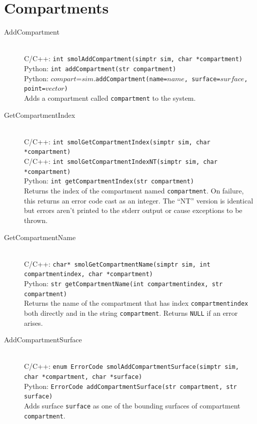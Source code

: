 \documentclass {scrbook}
\newcommand {\ttt} {\texttt}
\begin{document}
\section{Compartments}

\begin{description}

\item[AddCompartment]
\hfill \\
C/C++: \ttt{int smolAddCompartment(simptr sim, char *compartment)}\\
Python: \ttt{int addCompartment(str compartment)}\\
Python: $compart$=$sim$.\ttt{addCompartment(name=$name$, surface=$surface$, point=$vector$)}\\
Adds a compartment called \ttt{compartment} to the system.

\item[GetCompartmentIndex]
\hfill \\
C/C++: \ttt{int smolGetCompartmentIndex(simptr sim, char *compartment)}\\
C/C++: \ttt{int smolGetCompartmentIndexNT(simptr sim, char *compartment)}\\
Python: \ttt{int getCompartmentIndex(str compartment)}\\
Returns the index of the compartment named \ttt{compartment}. On failure, this returns an error code cast as an integer. The ``NT'' version is identical but errors aren't printed to the stderr output or cause exceptions to be thrown.

\item[GetCompartmentName]
\hfill \\
C/C++: \ttt{char* smolGetCompartmentName(simptr sim, int compartmentindex, char *compartment)}\\
Python: \ttt{str getCompartmentName(int compartmentindex, str compartment)}\\
Returns the name of the compartment that has index \ttt{compartmentindex} both directly and in the string \ttt{compartment}. Returns \ttt{NULL} if an error arises.

\item[AddCompartmentSurface]
\hfill \\
C/C++: \ttt{enum ErrorCode smolAddCompartmentSurface(simptr sim, char *compartment, char *surface)}\\
Python: \ttt{ErrorCode addCompartmentSurface(str compartment, str surface)}\\
Adds surface \ttt{surface} as one of the bounding surfaces of compartment \ttt{compartment}.


\end{description}
\end{document}
